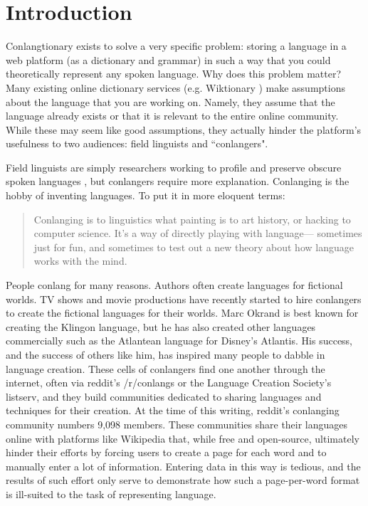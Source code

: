 \chapter{Introduction}
\label{chap:introduction}

Conlangtionary exists to solve a very specific problem: storing a language in a web platform (as a dictionary and grammar) in such a way that you could theoretically represent any spoken language. Why does this problem matter? Many existing online dictionary services (e.g. Wiktionary \cite{Wiktionary}) make assumptions about the language that you are working on. Namely, they assume that the language already exists or that it is relevant to the entire online community. While these may seem like good assumptions, they actually hinder the platform's usefulness to two audiences: field linguists and ``conlangers".

Field linguists are simply researchers working to profile and preserve obscure spoken languages \cite{Field-linguistics}, but conlangers require more explanation. Conlanging is the hobby of inventing languages. To put it in more eloquent terms:

\begin{quote}
Conlanging is to linguistics what painting is
to art history, or hacking to computer science.
It’s a way of directly playing with language—
sometimes just for fun, and sometimes to test
out a new theory about how language works
with the mind. \cite{Conlanging-101}
\end{quote}

People conlang for many reasons. Authors often create languages for fictional worlds. TV shows and movie productions have recently started to hire conlangers to create the fictional languages for their worlds. Marc Okrand is best known for creating the Klingon language, but he has also created other languages commercially such as the Atlantean language for Disney's Atlantis. His success, and the success of others like him, has inspired many people to dabble in language creation. These cells of conlangers find one another through the internet, often via reddit's /r/conlangs or the Language Creation Society's listserv, and they build communities dedicated to sharing languages and techniques for their creation. At the time of this writing, reddit's conlanging community numbers 9,098 members. These communities share their languages online with platforms like Wikipedia that, while free and open-source, ultimately hinder their efforts by forcing users to create a page for each word and to manually enter a lot of information. Entering data in this way is tedious, and the results of such effort only serve to demonstrate how such a page-per-word format is ill-suited to the task of representing language.

